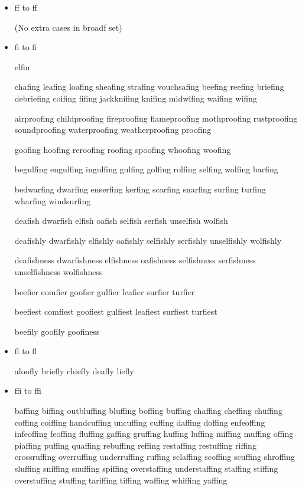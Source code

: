 \begin{itemize}

\item ff to f\hspace{0pt}f

(No extra cases in broadf set)


\item fi to f\hspace{0pt}i

elfin

chafing leafing loafing sheafing strafing vouchsafing
beefing reefing briefing debriefing
coifing fifing jackknifing knifing midwifing waifing wifing

airproofing childproofing fireproofing flameproofing mothproofing rustproofing soundproofing waterproofing weatherproofing proofing

goofing hoofing reroofing roofing spoofing whoofing woofing

begulfing engulfing ingulfing gulfing golfing rolfing selfing wolfing
barfing

bedwarfing dwarfing enserfing kerfing scarfing snarfing
surfing turfing wharfing windsurfing

deafish dwarfish elfish oafish selfish serfish unselfish wolfish

deafishly dwarfishly elfishly oafishly selfishly serfishly unselfishly wolfishly

deafishness dwarfishness elfishness oafishness selfishness serfishness unselfishness wolfishness

beefier comfier goofier gulfier leafier surfier turfier

beefiest comfiest goofiest gulfiest leafiest surfiest turfiest

beefily goofily goofiness


\item fl to f\hspace{0pt}l

aloofly briefly chiefly deafly liefly


\item ffi to ff\hspace{0pt}i

baffing biffing outbluffing bluffing boffing buffing chaffing cheffing chuffing coffing coiffing handcuffing uncuffing cuffing daffing doffing enfeoffing infeoffing feoffing fluffing gaffing gruffing huffing luffing miffing muffing offing piaffing puffing quaffing rebuffing reffing restaffing restuffing riffing crossruffing overruffing underruffing ruffing sclaffing scoffing scuffing shroffing sluffing sniffing snuffing spiffing overstaffing understaffing staffing stiffing overstuffing stuffing tariffing tiffing waffing whiffing yaffing


\end{itemize}
